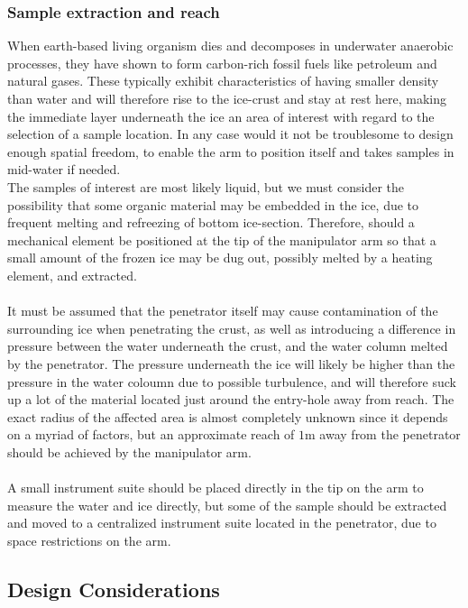 \subsubsection{Sample extraction and reach}
When earth-based living organism dies and decomposes in underwater anaerobic processes, they have shown to form carbon-rich fossil fuels like petroleum and 	natural gases. These typically exhibit characteristics of having smaller density than water and will therefore rise to the ice-crust and stay at rest here, making the immediate layer underneath the ice an area of interest with regard to the selection of a sample location. In any case would it not be troublesome to design enough spatial freedom, to enable the arm to position itself and takes samples in mid-water if needed. 
\\The samples of interest are most likely liquid, but we must consider the possibility that some organic material may be embedded in the ice, due to frequent melting and refreezing of bottom ice-section. Therefore, should a mechanical element be positioned at the tip of the manipulator arm so that a small amount of the frozen ice may be dug out, possibly melted by a heating element, and extracted.
\\
\\It must be assumed that the penetrator itself may cause contamination of the surrounding ice when penetrating the crust, as well as introducing a difference in pressure between the water underneath the crust, and the water column melted by the penetrator. The pressure underneath the ice will likely be higher than the pressure in the water coloumn due to possible turbulence, and will therefore suck up a lot of the material located just around the entry-hole away from reach. The exact radius of the affected area is almost completely unknown since it depends on a myriad of factors, but an approximate reach of $1\mathrm{m}$ away from the penetrator should be achieved by the manipulator arm. 
\\
\\A small instrument suite should be placed directly in the tip on the arm to measure the water and ice directly, but some of the sample should be extracted and moved to a centralized instrument suite located in the penetrator, due to space restrictions on the arm.

\subsection{Design Considerations}

